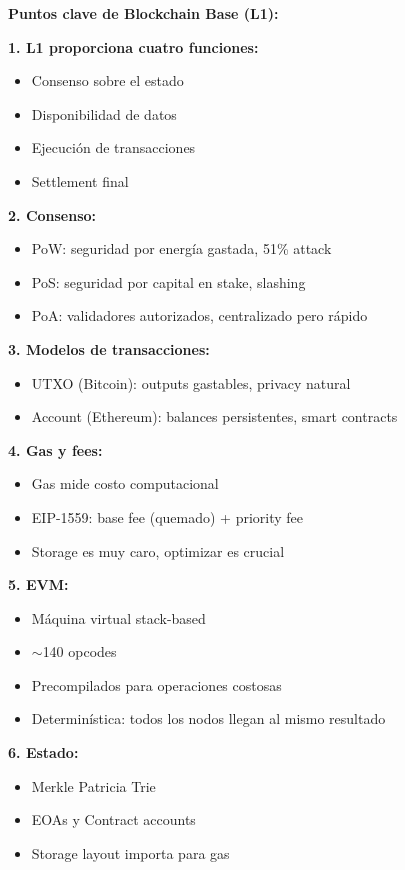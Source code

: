 \documentclass[11pt,a4paper,twoside,openright]{book}
\theoremstyle{definition}
\theoremstyle{plain}
\theoremstyle{remark}
\begin{document}
\begin{keyidea}
\textbf{Puntos clave de Blockchain Base (L1):}

\textbf{1. L1 proporciona cuatro funciones:}
\begin{itemize}
    \item Consenso sobre el estado
    \item Disponibilidad de datos
    \item Ejecución de transacciones
    \item Settlement final
\end{itemize}

\textbf{2. Consenso:}
\begin{itemize}
    \item PoW: seguridad por energía gastada, 51\% attack
    \item PoS: seguridad por capital en stake, slashing
    \item PoA: validadores autorizados, centralizado pero rápido
\end{itemize}

\textbf{3. Modelos de transacciones:}
\begin{itemize}
    \item UTXO (Bitcoin): outputs gastables, privacy natural
    \item Account (Ethereum): balances persistentes, smart contracts
\end{itemize}

\textbf{4. Gas y fees:}
\begin{itemize}
    \item Gas mide costo computacional
    \item EIP-1559: base fee (quemado) + priority fee
    \item Storage es muy caro, optimizar es crucial
\end{itemize}

\textbf{5. EVM:}
\begin{itemize}
    \item Máquina virtual stack-based
    \item $\sim$140 opcodes
    \item Precompilados para operaciones costosas
    \item Determinística: todos los nodos llegan al mismo resultado
\end{itemize}

\textbf{6. Estado:}
\begin{itemize}
    \item Merkle Patricia Trie
    \item EOAs y Contract accounts
    \item Storage layout importa para gas
\end{itemize}


\end{keyidea}
\end{document}
